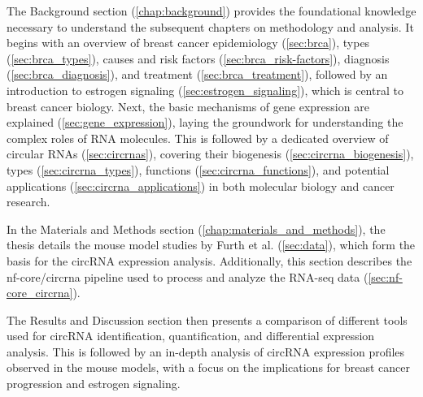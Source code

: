 The Background section (\cref{chap:background}) provides the foundational
knowledge necessary to understand the subsequent chapters on methodology and
analysis.
It begins with an overview of breast cancer epidemiology (\cref{sec:brca}),
types (\cref{sec:brca_types}), causes and risk factors
(\cref{sec:brca_risk-factors}), diagnosis (\cref{sec:brca_diagnosis}), and
treatment (\cref{sec:brca_treatment}), followed by an introduction to estrogen
signaling (\cref{sec:estrogen_signaling}), which is central to breast cancer
biology.
Next, the basic mechanisms of gene expression are explained
(\cref{sec:gene_expression}), laying the groundwork for understanding the
complex roles of RNA molecules.
This is followed by a dedicated overview of circular RNAs
(\cref{sec:circrnas}), covering their biogenesis
(\cref{sec:circrna_biogenesis}), types (\cref{sec:circrna_types}), functions
(\cref{sec:circrna_functions}), and potential applications
(\cref{sec:circrna_applications}) in both molecular biology and cancer
research.

In the Materials and Methods section (\cref{chap:materials_and_methods}), the
thesis details the mouse model studies by Furth et al.
\supercite{furth_esr1_2023,furth_overexpression_2023} (\cref{sec:data}),
which form the basis for the circRNA expression
analysis.
Additionally, this section describes the nf-core/circrna
pipeline\supercite{digby_nf-corecircrna_2023} used to process and analyze the
RNA-seq data (\cref{sec:nf-core_circrna}).

The Results and Discussion section then presents a comparison of different
tools used for circRNA identification, quantification, and differential
expression analysis.
This is followed by an in-depth analysis of circRNA expression profiles
observed in the mouse models, with a focus on the implications for breast
cancer progression and estrogen signaling.
